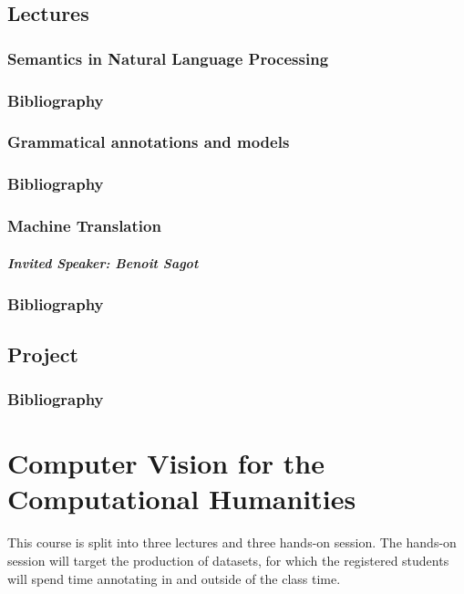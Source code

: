 \documentclass{report}
\begin{document}
\section{Lectures}

\subsection{Semantics in Natural Language Processing}

\subsection*{Bibliography}

\subsection{Grammatical annotations and models}

\subsection*{Bibliography}

\subsection{Machine Translation}

\paragraph{Invited Speaker: Benoit Sagot}

\subsection*{Bibliography}

\section{Project}

\subsection*{Bibliography}

\chapter{Computer Vision for the Computational Humanities}

This course is split into three lectures and three hands-on session. The hands-on session will target the production of datasets, for which the registered students will spend time annotating in and outside of the class time.
\end{document}
